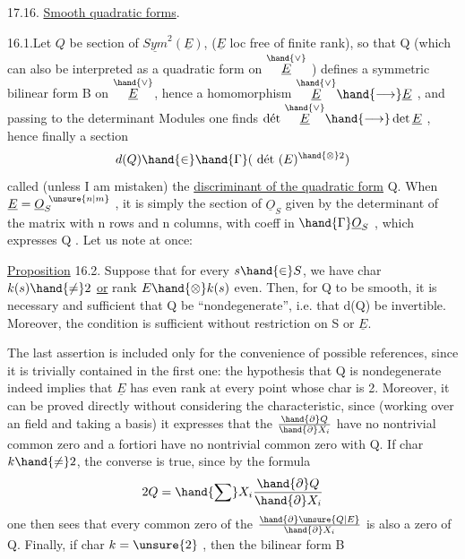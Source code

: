   

17.16. \uline{Smooth quadratic forms}.

16.1.Let $Q$ be  section of $\underline{Sym}^2(\underline{E})$, ($\underline{E}$ loc free of finite rank),
so that Q  (which can also be interpreted as a quadratic
form on $\overset{\hand{\vee}}{\underline{E}}$ )  defines a symmetric bilinear
form B on $\overset{\hand{\vee}}{\underline{E}}$, hence a homomorphism $\overset{\hand{\vee}}{\underline{E}} \hand{\longrightarrow} \underline{E}$ , and passing to the
determinant Modules one finds $\text{dét}\ \overset{\hand{\vee}}{\underline{E}} \hand{\longrightarrow} \det \underline{E}$ , hence finally a section
\[ d(Q) \hand{\in} \hand{\Gamma}(\ \text{dét}\ (E)^{\hand{\otimes} 2}) \]
called (unless I am mistaken) the \uline{discriminant of the quadratic form} Q. When
$\underline{E} = \underline{O}_S^{\ \unsure{n|m}}$ , it is simply the section of $\underline{O}_S$ given by the determinant of the matrix
with n rows and n columns, with coeff in $\hand{\Gamma}\underline{O}_S$ , which expresses Q . Let us note
at once:

\uline{Proposition} 16.2. Suppose that for every $s \hand{\in} S$, we have char $k(s) \hand{\neq} 2$ \uline{or}
rank $E\hand{\otimes} k(s)$ even. Then, for Q to be smooth, it is necessary and sufficient that Q be
``nondegenerate'', i.e. that d(Q) be invertible. \hand{(}Moreover, the condition is
sufficient without restriction on S or $\underline{E}$\hand{)}.

The last assertion is included only for the convenience of possible
references, since it is trivially contained in the first one:
the hypothesis that Q is nondegenerate indeed implies that $\underline{E}$ has even rank
at every point whose char is 2. Moreover, it can be proved directly
without considering the characteristic, since (working over an
 field and taking a basis) it expresses that the $\frac{\hand{\partial} Q}{\hand{\partial} X_i}$ have no nontrivial common zero
and a fortiori  have no nontrivial common zero with Q.
If char $k \hand{\neq} 2$, the converse is true, since by the formula
\[ 2Q = \hand{\sum} X_i \frac{\hand{\partial} Q}{\hand{\partial} X_i} \]
one then sees that every common zero of the $\frac{\hand{\partial} \unsure{Q|E}}{\hand{\partial} X_i}$ is also a zero of Q. Finally,
if char $k = \unsure{2}$ ,  then the bilinear form B

